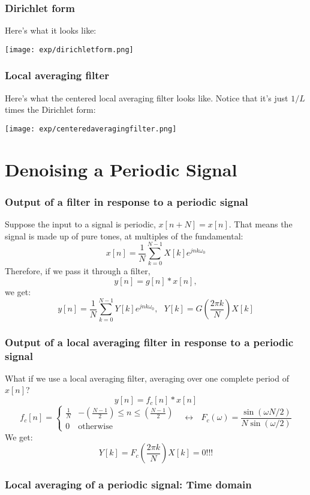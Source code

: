 \documentclass{beamer}
\begin{document}
\begin{frame}
  \frametitle{Dirichlet form}

  Here's what it looks like:
  \centerline{\texttt{[image: exp/dirichletform.png]}}
\end{frame}
  
\begin{frame}
  \frametitle{Local averaging filter}

  Here's what the centered local averaging filter looks like.  Notice that
  it's just $1/L$ times the Dirichlet form:
  \centerline{\texttt{[image: exp/centeredaveragingfilter.png]}}
\end{frame}
  
\section[Denoising]{Denoising a Periodic Signal}
\setcounter{subsection}{1}

\begin{frame}
  \frametitle{Output of a filter in response to a periodic signal}

  Suppose the input to a signal is periodic, $x[n+N]=x[n]$.  That
  means the signal is made up of pure tones, at multiples of the
  fundamental:
  \[
  x[n] = \frac{1}{N}\sum_{k=0}^{N-1} X[k] e^{jnk\omega_0}
  \]
  Therefore, if we pass it through a filter,
  \[
  y[n]=g[n]\ast x[n],
  \]
  we get:
  \[
  y[n]=\frac{1}{N}\sum_{k=0}^{N-1} Y[k] e^{jnk\omega_0},~~~Y[k]=G\left(\frac{2\pi k}{N}\right)X[k]
  \]
\end{frame}

\begin{frame}
  \frametitle{Output of a local averaging filter in response to a periodic signal}

  What if we use a local averaging filter, averaging over one complete
  period of $x[n]$?
  \[
  y[n] = f_c[n]\ast x[n]
  \]
  \[
  f_c[n] = \begin{cases}
    \frac{1}{N} & -\left(\frac{N-1}{2}\right)\le n\le \left(\frac{N-1}{2}\right)\\
    0 & \mbox{otherwise}
  \end{cases}~~~\leftrightarrow~~~
  F_c(\omega)=\frac{\sin(\omega N/2)}{N\sin(\omega/2)}
  \]
  We get:
  \[
  Y[k]=F_c\left(\frac{2\pi k}{N}\right)X[k]=0!!!
  \]
\end{frame}

\begin{frame}
  \frametitle{Local averaging of a periodic signal: Time domain}

  \centerline{}
\end{frame}
\end{document}
